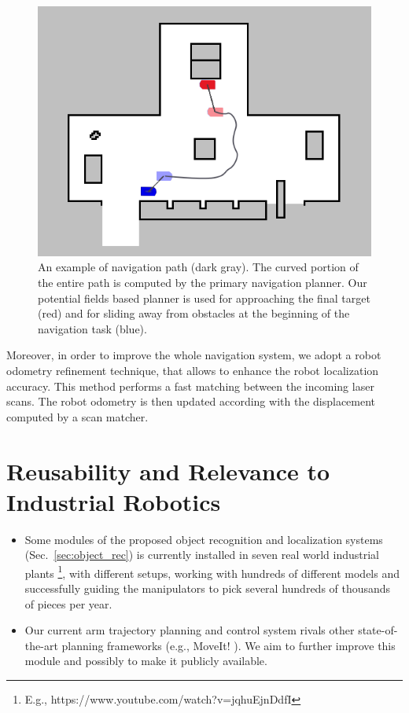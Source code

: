 \documentclass[conference]{IEEEtran}
\begin{document}
\begin{figure}[h!]
\begin{center}
\begin{minipage}[b]{0.6\linewidth}
	\begin{center}\includegraphics[angle=0,width=\linewidth]{images/navigation.png}\end{center}
\end{minipage}\hfill
\end{center}
\caption{An example of navigation path (dark gray). The curved portion of the entire path is computed by the primary navigation planner. Our potential fields based planner is used for approaching the final target (red) and for sliding away from obstacles at the beginning of the navigation task (blue).}\label{fig:intro_navigation}
\end{figure}

Moreover, in order to improve the whole navigation system, we adopt a robot odometry refinement technique, that allows to enhance the robot localization accuracy. This method performs a fast matching between the incoming laser scans. The robot odometry is then updated according with the displacement computed by a scan matcher.\\

\section{Reusability and Relevance to Industrial Robotics}

\begin{itemize}
 \item Some modules of the proposed object recognition and localization systems (Sec.~\ref{sec:object_rec}) is currently installed in seven real world industrial plants \footnote{E.g., https://www.youtube.com/watch?v=jqhuEjnDdfI}, with different setups, working with hundreds of different models and successfully guiding the manipulators to pick several hundreds of thousands of pieces per year. 
 \item Our current arm trajectory planning and control system rivals other state-of-the-art planning frameworks (e.g., MoveIt! \cite{moveitweb}). We aim to further improve this module and possibly to make it publicly available.
\end{itemize}


 

\end{document}
